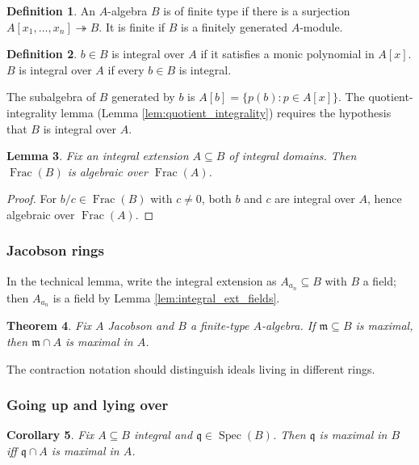 \documentclass[12pt]{article}
\theoremstyle{plain}
\newtheorem{thm}{Theorem}[subsection] %
\newtheorem{lemma}[thm]{Lemma}
\newtheorem{cor}[thm]{Corollary}
\theoremstyle{definition}
\newtheorem{defn}[thm]{Definition} %
\begin{document}
\begin{defn}
An $A$-algebra $B$ is of finite type if there is a surjection $A[x_1,\ldots,x_n]\twoheadrightarrow B$. It is finite if $B$ is a finitely generated $A$-module.
\end{defn}

\begin{defn}
$b\in B$ is integral over $A$ if it satisfies a monic polynomial in $A[x]$. $B$ is integral over $A$ if every $b\in B$ is integral.
\end{defn}

The subalgebra of $B$ generated by $b$ is $A[b]=\{p(b):p\in A[x]\}$. The quotient-integrality lemma (Lemma \ref{lem:quotient_integrality}) requires the hypothesis that $B$ is integral over $A$.

\begin{lemma}\label{lem:int_alg_corr}
Fix an integral extension $A\subseteq B$ of integral domains. Then $\operatorname{Frac}(B)$ is algebraic over $\operatorname{Frac}(A)$.
\end{lemma}
\begin{proof}
For $b/c\in\operatorname{Frac}(B)$ with $c\ne 0$, both $b$ and $c$ are integral over $A$, hence algebraic over $\operatorname{Frac}(A)$.
\end{proof}

\subsubsection*{Jacobson rings}

In the technical lemma, write the integral extension as $A_{a_n}\subseteq B$ with $B$ a field; then $A_{a_n}$ is a field by Lemma \ref{lem:integral_ext_fields}.

\begin{thm}
Fix $A$ Jacobson and $B$ a finite-type $A$-algebra. If $\mathfrak{m}\subseteq B$ is maximal, then $\mathfrak{m}\cap A$ is maximal in $A$.
\end{thm}

The contraction notation should distinguish ideals living in different rings.

\subsubsection*{Going up and lying over}

\begin{cor}
Fix $A\subseteq B$ integral and $\mathfrak{q}\in\operatorname{Spec}(B)$. Then $\mathfrak{q}$ is maximal in $B$ iff $\mathfrak{q}\cap A$ is maximal in $A$.
\end{cor}
\end{document}
